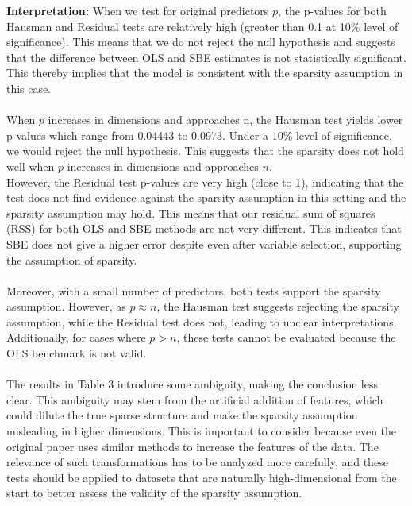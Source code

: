 \textbf{Interpretation:} When we test for original predictors $p$, the p-values for both Hausman and Residual tests are relatively high (greater than 0.1 at 10\% level of significance). This means that we do not reject the null hypothesis and suggests that the difference between OLS and SBE estimates is not statistically significant. This thereby implies that the model is consistent with the sparsity assumption in this case. \\
\\
When $p$ increases in dimensions and approaches n, the Hausman test yields lower p-values which range from 0.04443 to 0.0973. Under a 10\% level of significance, we would reject the null hypothesis. This suggests that the sparsity does not hold well when $p$ increases in dimensions and approaches $n$.\\
However, the Residual test p-values are very high (close to 1), indicating that the test does not find evidence against the sparsity assumption in this setting and the sparsity assumption may hold. This means that our residual sum of squares (RSS) for both OLS and SBE methods are not very different. This indicates that SBE does not give a higher error despite even after variable selection, supporting the assumption of sparsity.\\
\\
Moreover, with a small number of predictors, both tests support the sparsity assumption. However, as $p \approx n$, the Hausman test suggests rejecting the sparsity assumption, while the Residual test does not, leading to unclear interpretations. Additionally, for cases where $p>n$, these tests cannot be evaluated because the OLS benchmark is not valid.\\
\\
The results in Table 3 introduce some ambiguity, making the conclusion less clear. This ambiguity may stem from the artificial addition of features, which could dilute the true sparse structure and make the sparsity assumption misleading in higher dimensions. This is important to consider because even the original paper uses similar methods to increase the features of the data. The relevance of such transformations has to be analyzed more carefully, and these tests should be applied to datasets that are naturally high-dimensional from the start to better assess the  validity of the sparsity assumption.\\
